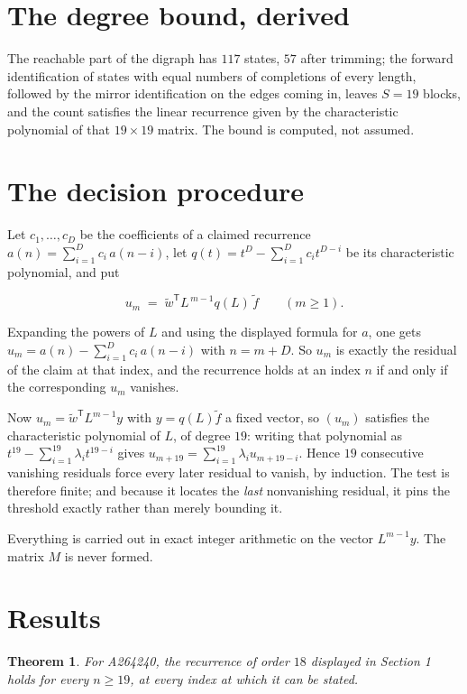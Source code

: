 \documentclass[11pt]{article}
\newtheorem{theorem}{Theorem}
\theoremstyle{definition}
\begin{document}
\section{The degree bound, derived}

The reachable part of the digraph has $117$ states, $57$ after trimming; the forward identification of states with equal numbers of completions of every length, followed by the mirror identification on the edges coming in, leaves $S = 19$ blocks, and the count satisfies the linear recurrence given by the characteristic polynomial of that $19\times19$ matrix. The bound is computed, not assumed.

\section{The decision procedure}

Let $c_1,\dots,c_D$ be the coefficients of a claimed recurrence $a(n) = \sum_{i=1}^{D} c_i\,a(n-i)$, let $q(t) = t^{D} - \sum_{i=1}^{D} c_i t^{D-i}$ be its characteristic polynomial, and put

\[u_m \;=\; \tilde w^{\mathsf T} L^{\,m-1} q(L)\,\tilde f \qquad (m \ge 1).\]

Expanding the powers of $L$ and using the displayed formula for $a$, one gets $u_m = a(n) - \sum_{i=1}^{D} c_i\,a(n-i)$ with $n = m + D$. So $u_m$ is exactly the residual of the claim at that index, and the recurrence holds at an index $n$ if and only if the corresponding $u_m$ vanishes.

Now $u_m = \tilde w^{\mathsf T} L^{m-1} y$ with $y = q(L)\tilde f$ a fixed vector, so $(u_m)$ satisfies the characteristic polynomial of $L$, of degree $19$: writing that polynomial as $t^{19} - \sum_{i=1}^{19} \lambda_i t^{19-i}$ gives $u_{m+19} = \sum_{i=1}^{19} \lambda_i u_{m+19-i}$. Hence $19$ consecutive vanishing residuals force every later residual to vanish, by induction. The test is therefore finite; and because it locates the {\itshape last} nonvanishing residual, it pins the threshold exactly rather than merely bounding it.

Everything is carried out in exact integer arithmetic on the vector $L^{m-1}y$. The matrix $M$ is never formed.

\section{Results}

\begin{theorem} For A264240, the recurrence of order $18$ displayed in Section 1 holds for every $n \ge 19$, at every index at which it can be stated.\end{theorem}
\end{document}
